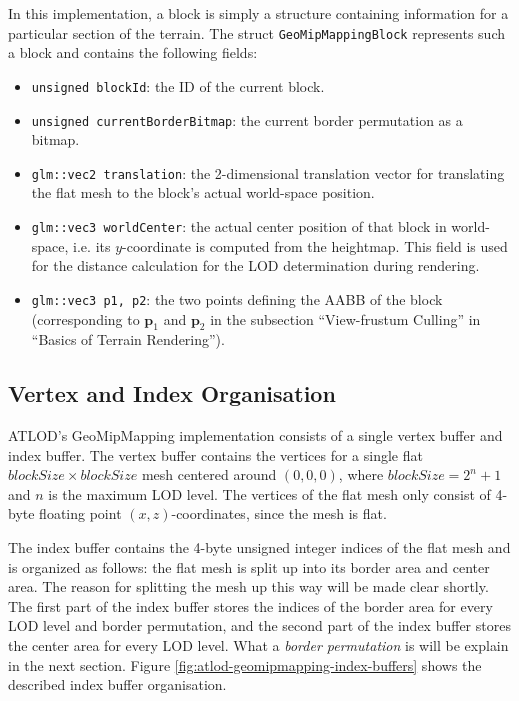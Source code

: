 In this implementation, a block is simply a structure containing information for a
particular section of the terrain. The struct \texttt{GeoMipMappingBlock}
represents such a block and contains the following fields:
\begin{itemize}
  \item \texttt{unsigned blockId}: the ID of the current block.
  \item \texttt{unsigned currentBorderBitmap}: the current border permutation as a bitmap.
  \item \texttt{glm::vec2 translation}: the 2-dimensional translation vector for translating the flat mesh to the block's actual world-space position.
  \item \texttt{glm::vec3 worldCenter}: the actual center position of that block in world-space, i.e. its $y$-coordinate is computed from the heightmap. 
        This field is used for the distance calculation for the LOD determination during rendering.
  \item \texttt{glm::vec3 p1, p2}: the two points defining the AABB of the block (corresponding to $\mathbf{p}_1$ and $\mathbf{p}_2$ in the subsection ``View-frustum Culling'' in ``Basics of Terrain Rendering'').
\end{itemize}

\subsection{Vertex and Index Organisation}
ATLOD's GeoMipMapping implementation consists of a single vertex buffer and index buffer.
The vertex buffer contains the vertices for a single flat $blockSize \times blockSize$ mesh centered around $(0,0,0)$, where $blockSize = 2^n + 1$ and $n$ is the maximum LOD level.
The vertices of the flat mesh only consist of 4-byte floating point $(x,z)$-coordinates, since the mesh is flat.

The index buffer contains the 4-byte unsigned integer indices of the flat mesh and is organized as follows:
the flat mesh is split up into its border area and center area.
The reason for splitting the mesh up this way will be made clear shortly.
The first part of the index buffer stores the indices of the border area
for every LOD level and border permutation, and
the second part of the index buffer stores the center area for every LOD level. 
What a \textit{border permutation} is will be explain in the next section.
Figure \ref{fig:atlod-geomipmapping-index-buffers} shows the described index buffer 
organisation.

